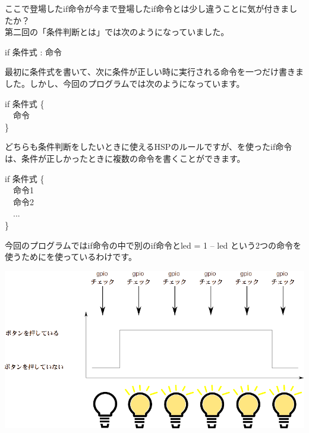 ここで登場したif命令が今まで登場したif命令とは少し違うことに気が付きましたか？\\
第二回の「条件判断とは」では次のようになっていました。\\
\begin{center}
 					if 条件式 : 命令 \\
\end{center}
最初に条件式を書いて、次に条件が正しい時に実行される命令を一つだけ書きました。しかし、今回のプログラムでは次のようになっています。\\
\begin{center}
  \begin{minipage}{4cm}
    if 条件式 \{\\ \ \ 命令\\ \}
  \end{minipage}
\end{center}
どちらも条件判断をしたいときに使えるHSPのルールですが、{}を使ったif命令は、条件が正しかったときに複数の命令を書くことができます。\\
\begin{center}
  \begin{minipage}{4cm}
					if 条件式 \{\\
					  \ \ 命令1\\
					  \ \ 命令2\\
					  \ \ ...\\
					\}\\
  \end{minipage}
\end{center}
今回のプログラムではif命令の中で別のif命令とled = 1 – led という2つの命令を使うために{}を使っているわけです。\\

\begin{center}
\includegraphics[width=\linewidth]{images/chap03/text03-img033.png}
\end{center}

